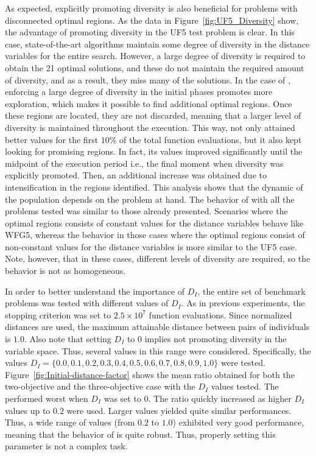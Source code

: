 As expected, explicitly promoting diversity is also beneficial for problems with disconnected optimal regions.
%
As the data in Figure~\ref{fig:UF5_Diversity} show, the advantage of promoting diversity in the UF5 test 
problem is clear.
%
In this case, state-of-the-art algorithms maintain some degree of diversity in the distance variables for
the entire search.
%
However, a large degree of diversity is required to obtain the 21 optimal solutions, and these \MOEAS{} do not maintain
the required amount of diversity, and as a result, they miss many of the solutions.
%
In the case of \AVSDMOEAD{}, enforcing a large degree of diversity in the initial phases promotes more exploration, 
which makes it possible to find additional optimal regions.
%
Once these regions are located, they are not discarded, meaning that a larger level of diversity is maintained throughout the
execution.
%
This way, \AVSDMOEAD{} not only attained better \HV{} values for the first $10\%$ of the total function evaluations, but 
it also kept looking for promising regions.
%
In fact, its \HV{} values improved significantly until the midpoint of the execution period i.e., the final moment
when diversity was explicitly promoted.
%
Then, an additional increase was obtained due to intensification in the regions identified.
%
This analysis shows that the dynamic of the population depends on the problem at hand.
%
The behavior of \AVSDMOEAD{} with all the problems tested
was similar to those already presented.
%
Scenaries where the optimal regions consists of constant values for the distance variables behave like WFG5, whereas
the behavior in those cases where the optimal regions consist of non-constant values for the distance variables is
more similar to the UF5 case.
%
Note, however, that in these cases, different levels of diversity are required, so the behavior is not as homogeneous.






In order to better understand the importance of $D_I$, the entire set of benchmark problems was tested with different values
of $D_I$.
%
As in previous experiments, the stopping criterion was set to $2.5 \times 10^7$ function evaluations.
%
Since normalized distances are used, the maximum attainable distance between pairs of individuals is $1.0$.
%
Also note that setting $D_I$ to $0$ implies not promoting diversity in the variable space.
%
Thus, several values in this range were considered.
%
Specifically, the values $D_I = \{0.0, 0.1, 0.2, 0.3, 0.4, 0.5, 0.6, 0.7, 0.8, 0.9, 1.0\}$ were tested.
%
Figure~\ref{fig:Initial-distance-factor} shows the mean \HV{} ratio obtained for both the two-objective 
and the three-objective case with the $D_I$ values tested.
%
The \AVSDMOEAD{} performed worst when $D_I$ was set to $0$.
%
The \HV{} ratio quickly increased as higher $D_I$ values up to $0.2$ were used.
%
Larger values yielded quite similar performances.
%
Thus, a wide range of values (from $0.2$ to $1.0$) exhibited very good performance, 
meaning that the behavior of \AVSDMOEAD{} is quite robust.
%
Thus, properly setting this parameter is not a complex task.


